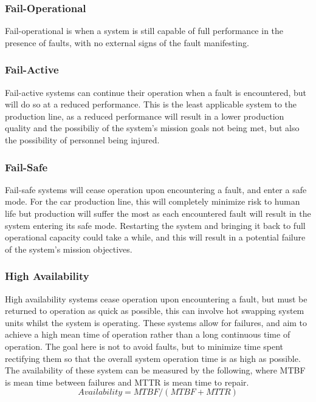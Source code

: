 \documentclass[]{report}
\begin{document}
				\subsubsection{Fail-Operational}
				Fail-operational is when a system is still capable of full performance in the presence of faults, with no external signs of the fault manifesting. 
				
				\subsubsection{Fail-Active}
				Fail-active systems can continue their operation when a fault is encountered, but will do so at a reduced performance. This is the least applicable system to the production line, as a reduced performance will result in a lower production quality and the possibiliy of the system's mission goals not being met, but also the possibility of personnel being injured. 
				
				\subsubsection{Fail-Safe}
				Fail-safe systems will cease operation upon encountering a fault, and enter a safe mode. For the car production line, this will completely minimize risk to human life but production will suffer the most as each encountered fault will result in the system entering its safe mode. Restarting the system and bringing it back to full operational capacity could take a while, and this will result in a potential failure of the system's mission objectives.
				
				\subsubsection{High Availability}
				High availability systems cease operation upon encountering a fault, but must be returned to operation as quick as possible, this can involve hot swapping system units whilst the system is operating. These systems allow for failures, and aim to achieve a high mean time of operation rather than a long continuous time of operation. The goal here is not to avoid faults, but to minimize time spent rectifying them so that the overall system operation time is as high as possible\cite{gray1991high}. The availability of these system can be measured by the following, where MTBF is mean time between failures and MTTR is mean time to repair.
				\begin{equation*}
				Availability = MTBF/(MTBF + MTTR)
				\end{equation*}
				
\end{document}
